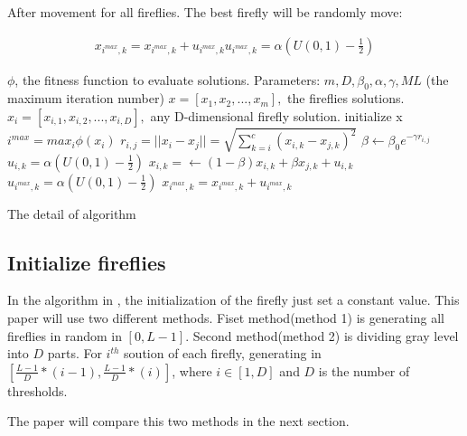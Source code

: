 \documentclass[conference]{IEEEtran}
\begin{document}
After movement for all fireflies. The best firefly will be randomly move:

\begin{equation}
\begin{aligned}
    \label{best firefly movement}
    x_{i^{max},k}=x_{i^{max},k}+u_{i^{max},k}
    u_{i^{max},k}=\alpha(U(0,1)-\frac{1}{2})
\end{aligned}
\end{equation}

\begin{algorithm}
\begin{algorithmic}[1]
    \STATE $\phi$, the fitness function to evaluate solutions.
    \STATE Parameters: $m, D,\beta_0,\alpha,\gamma,ML$ (the maximum iteration number) 
    \STATE $x=[x_1,x_2,...,x_m],$ the fireflies solutions.
    \STATE $x_i=[x_{i,1},x_{i,2},...,x_{i,D}],$ any D-dimensional firefly solution.
    \STATE initialize x
        \STATE $i^{max}=max_{i}\phi(x_i)$
                    \STATE $r_{i,j}=||x_i-x_j||=\sqrt{\sum\limits_{k=i}^{c}(x_{i,k}-x_{j,k})^2}$
                    \STATE $\beta\leftarrow\beta_0 e^{-\gamma r_{i,j}}$
                        \STATE $u_{i,k}=\alpha(U(0,1)-\frac{1}{2})$
                        \STATE $x_{i,k}=\leftarrow (1-\beta)x_{i,k}+\beta x_{j,k}+u_{i,k}$
                    \ENDFOR
                \ENDIF
            \ENDFOR
        \ENDFOR
            \STATE $u_{i^{max},k}=\alpha(U(0,1)-\frac{1}{2})$
            \STATE $x_{i^{max},k}=x_{i^{max},k}+u_{i^{max},k}$
        \ENDFOR
    \ENDFOR
\end{algorithmic}
\caption{The detail of algorithm}
\end{algorithm}

\subsection{Initialize fireflies}
In the algorithm in \cite{b1}, the initialization of the firefly just set a constant value. This paper will use two different methods. Fiset method(method 1) is generating all fireflies in random in $[0,L-1]$. Second method(method 2) is dividing gray level into $D$ parts. For $i^{th}$ soution of each firefly, generating in $[\frac{L-1}{D}*(i-1),\frac{L-1}{D}*(i)]$, where $i\in[1,D]$ and $D$ is the number of thresholds. 

The paper will compare this two methods in the next section.
\end{document}
